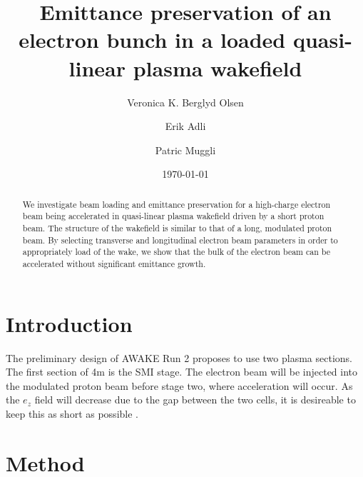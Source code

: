 \documentclass[aps,prstab,reprint,amsmath,amssymb,groupedaddress]{revtex4-1}
\begin{document}

\title{Emittance preservation of an electron bunch in a loaded quasi-linear plasma wakefield}

\author{Veronica K. Berglyd Olsen}

\author{Erik Adli}

\author{Patric Muggli}

\date{\today}

\begin{abstract}
We investigate beam loading and emittance preservation for a high-charge electron beam being accelerated in quasi-linear plasma wakefield driven by a short proton beam. The structure of the wakefield is similar to that of a long, modulated proton beam. By selecting transverse and longitudinal electron beam parameters in order to  appropriately load of the wake, we show that the bulk of the electron beam can be accelerated without significant emittance growth.
\end{abstract}

\maketitle

\section[\label{S:I}]{Introduction}


The preliminary design of AWAKE Run 2 proposes to use two plasma sections. The first section of 4m is the SMI stage. The electron beam will be injected into the modulated proton beam before stage two, where acceleration will occur. As the $e_z$ field will decrease due to the gap between the two cells, it is desireable to keep this as short as possible \cite{adli:2016}.

\section[\label{S:M}]{Method}
\end{document}
